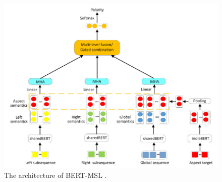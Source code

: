 \documentclass[preprint,12pt]{elsarticle}
\begin{document}
\begin{figure}[h!]
    \centering
    \includegraphics[scale=0.7]{fig_text_clf_BERT-MSL.png}
    \caption{The architecture of BERT-MSL \citep{zhu_bert-based_2023}.}
    \label{fig_text_clf_BERT-MSL}
\end{figure}
\end{document}
